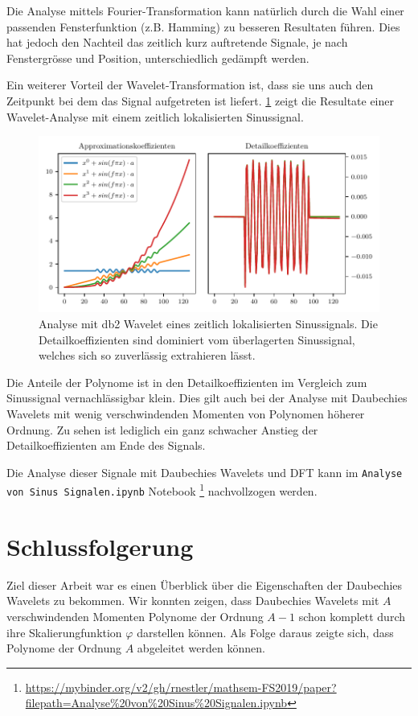 \begin{refsection}
Die Analyse mittels Fourier-Transformation kann natürlich durch die Wahl einer
passenden Fensterfunktion (z.B. Hamming) zu besseren Resultaten führen. Dies
hat jedoch den Nachteil das zeitlich kurz auftretende Signale, je nach
Fenstergrösse und Position, unterschiedlich gedämpft werden.

Ein weiterer Vorteil der Wavelet-Transformation ist, dass sie uns auch den
Zeitpunkt bei dem das Signal aufgetreten ist liefert.
\cref{polynomials:sin:padded} zeigt die Resultate einer Wavelet-Analyse mit
einem zeitlich lokalisierten Sinussignal.
\begin{figure}
    \centering
    \includegraphics{papers/polynomials/images/polynomials_sin_padded_db2.pdf}
    \caption{Analyse mit db2 Wavelet eines zeitlich lokalisierten
             Sinussignals. Die Detailkoeffizienten sind dominiert vom
             überlagerten Sinussignal, welches sich so zuverlässig extrahieren
             lässt.\label{polynomials:sin:padded}}
\end{figure}
Die Anteile der Polynome ist in den Detailkoeffizienten im Vergleich zum
Sinussignal vernachlässigbar klein. Dies gilt auch bei der Analyse mit
Daubechies Wavelets mit wenig verschwindenden Momenten von Polynomen höherer
Ordnung. Zu sehen ist lediglich ein ganz schwacher Anstieg der
Detailkoeffizienten am Ende des Signals.

Die Analyse dieser Signale mit Daubechies Wavelets und DFT kann im
\texttt{Analyse von Sinus Signalen.ipynb} Notebook%
\footnote{\url{https://mybinder.org/v2/gh/rnestler/mathsem-FS2019/paper?filepath=Analyse\%20von\%20Sinus\%20Signalen.ipynb}}
nachvollzogen werden.

\section{Schlussfolgerung}
Ziel dieser Arbeit war es einen Überblick über die Eigenschaften der Daubechies
Wavelets zu bekommen. Wir konnten zeigen, dass Daubechies Wavelets mit $A$
verschwindenden Momenten Polynome der Ordnung $A-1$ schon komplett durch ihre
Skalierungfunktion $\varphi$ darstellen können. Als Folge daraus zeigte sich,
dass Polynome der Ordnung $A$ abgeleitet werden können.


\end{refsection}
